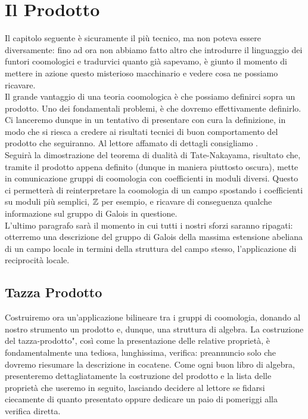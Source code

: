 \chapter{Il Prodotto}
Il capitolo seguente è sicuramente il più tecnico, ma non poteva essere diversamente: fino ad ora non abbiamo fatto altro che introdurre il linguaggio dei funtori coomologici e tradurvici quanto già sapevamo, è giunto il momento di mettere in azione questo misterioso macchinario e vedere cosa ne possiamo ricavare.\\

Il grande vantaggio di una teoria coomologica è che possiamo definirci sopra un prodotto. Uno dei fondamentali problemi, è che dovremo effettivamente definirlo. Ci lanceremo dunque in un tentativo di presentare con cura la definizione, in modo che si riesca a credere ai risultati tecnici di buon comportamento del prodotto che seguiranno. Al lettore affamato di dettagli consigliamo \cite{Schmidt}. \\

Seguirà la dimostrazione del teorema di dualità di Tate-Nakayama, risultato che, tramite il prodotto appena definito (dunque in maniera piuttosto oscura), mette in comunicazione gruppi di coomologia con coefficienti in moduli diversi. Questo ci permetterà di reinterpretare la coomologia di un campo spostando i coefficienti su moduli più semplici, $ \mathbb{Z} $ per esempio, e ricavare di conseguenza qualche informazione sul gruppo di Galois in questione. \\

L'ultimo paragrafo sarà il momento in cui tutti i nostri sforzi saranno ripagati: otterremo una descrizione del gruppo di Galois della massima estensione abeliana di un campo locale in termini della struttura del campo stesso, l'applicazione di reciprocità locale.

\section{Tazza Prodotto}
Costruiremo ora un'applicazione bilineare tra i gruppi di coomologia, donando al nostro strumento un prodotto e, dunque, una struttura di algebra. La costruzione del \leftquote tazza-prodotto", così come la presentazione delle relative proprietà, è fondamentalmente una tediosa, lunghissima, verifica: preannuncio solo che dovremo riesumare la descrizione in cocatene. Come ogni buon libro di algebra, presenteremo dettagliatamente la costruzione del prodotto e la lista delle proprietà che useremo in seguito, lasciando decidere al lettore se fidarsi ciecamente di quanto presentato oppure dedicare un paio di pomeriggi alla verifica diretta. \\

